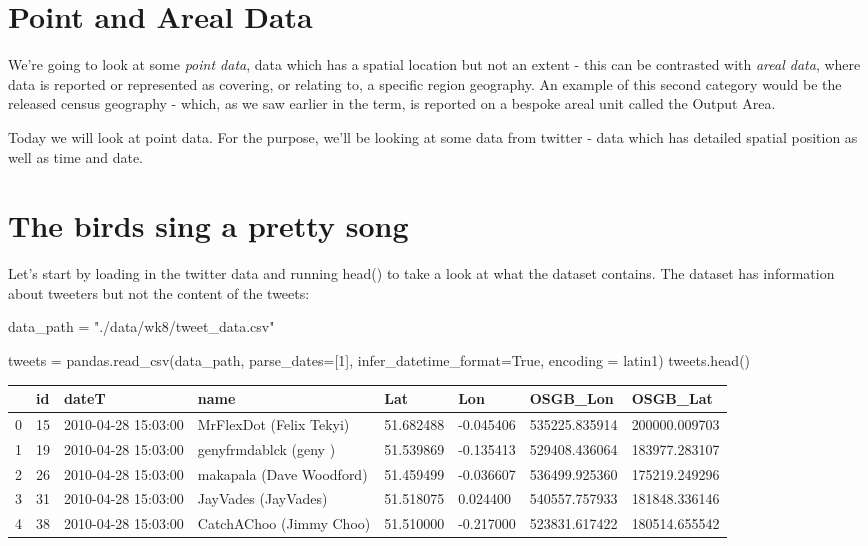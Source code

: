 \documentclass[
  letterpaper,
  DIV=11,
  numbers=noendperiod]{scrreprt}
\newenvironment{Shaded}{\begin{snugshade}}{\end{snugshade}}
\newcommand{\DecValTok}[1]{\textcolor[rgb]{0.68,0.00,0.00}{#1}}
\newcommand{\NormalTok}[1]{\textcolor[rgb]{0.00,0.23,0.31}{#1}}
\newcommand{\OperatorTok}[1]{\textcolor[rgb]{0.37,0.37,0.37}{#1}}
\newcommand{\StringTok}[1]{\textcolor[rgb]{0.13,0.47,0.30}{#1}}
\newcommand{\VariableTok}[1]{\textcolor[rgb]{0.07,0.07,0.07}{#1}}
\begin{document}
\hypertarget{point-and-areal-data}{%
\section{Point and Areal Data}\label{point-and-areal-data}}

We're going to look at some \emph{point data}, data which has a spatial
location but not an extent - this can be contrasted with \emph{areal
data}, where data is reported or represented as covering, or relating
to, a specific region geography. An example of this second category
would be the released census geography - which, as we saw earlier in the
term, is reported on a bespoke areal unit called the Output Area.

Today we will look at point data. For the purpose, we'll be looking at
some data from twitter - data which has detailed spatial position as
well as time and date.

\hypertarget{the-birds-sing-a-pretty-song}{%
\section{The birds sing a pretty
song}\label{the-birds-sing-a-pretty-song}}

Let's start by loading in the twitter data and running head() to take a
look at what the dataset contains. The dataset has information about
tweeters but not the content of the tweets:

\begin{Shaded}
\begin{Highlighting}[]
\NormalTok{data\_path }\OperatorTok{=} \StringTok{"./data/wk8/tweet\_data.csv"}

\NormalTok{tweets }\OperatorTok{=}\NormalTok{ pandas.read\_csv(data\_path, parse\_dates}\OperatorTok{=}\NormalTok{[}\DecValTok{1}\NormalTok{], infer\_datetime\_format}\OperatorTok{=}\VariableTok{True}\NormalTok{, encoding }\OperatorTok{=} \StringTok{\textquotesingle{}latin1\textquotesingle{}}\NormalTok{)}
\NormalTok{tweets.head()}
\end{Highlighting}
\end{Shaded}

\begin{longtable}[]{@{}llllllll@{}}
\toprule()
& id & dateT & name & Lat & Lon & OSGB\_Lon & OSGB\_Lat \\
\midrule()
\endhead
0 & 15 & 2010-04-28 15:03:00 & MrFlexDot (Felix Tekyi) & 51.682488 &
-0.045406 & 535225.835914 & 200000.009703 \\
1 & 19 & 2010-04-28 15:03:00 & genyfrmdablck (geny ) & 51.539869 &
-0.135413 & 529408.436064 & 183977.283107 \\
2 & 26 & 2010-04-28 15:03:00 & makapala (Dave Woodford) & 51.459499 &
-0.036607 & 536499.925360 & 175219.249296 \\
3 & 31 & 2010-04-28 15:03:00 & JayVades (JayVades) & 51.518075 &
0.024400 & 540557.757933 & 181848.336146 \\
4 & 38 & 2010-04-28 15:03:00 & CatchAChoo (Jimmy Choo) & 51.510000 &
-0.217000 & 523831.617422 & 180514.655542 \\
\bottomrule()
\end{longtable}
\end{document}
